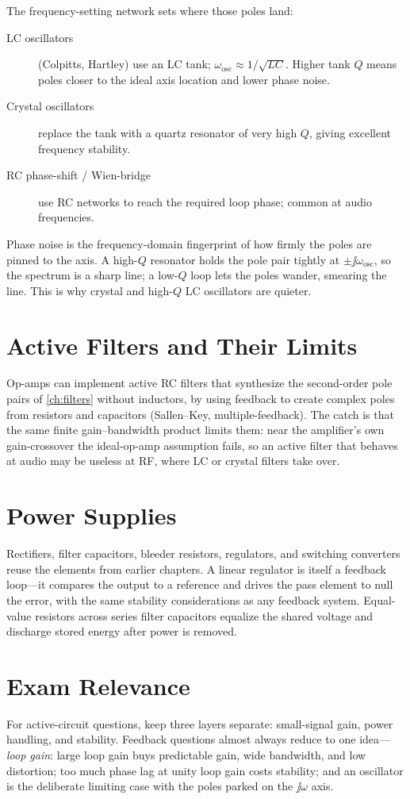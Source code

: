 The frequency-setting network sets where those poles land:
\begin{description}
\item[LC oscillators] (Colpitts, Hartley) use an LC tank; \(\omega_{\text{osc}}
\approx 1/\sqrt{LC}\). Higher tank \(Q\) means poles closer to the ideal axis
location and lower phase noise.
\item[Crystal oscillators] replace the tank with a quartz resonator of very high
\(Q\), giving excellent frequency stability.
\item[RC phase-shift / Wien-bridge] use RC networks to reach the required loop
phase; common at audio frequencies.
\end{description}

\begin{physicalbox}
Phase noise is the frequency-domain fingerprint of how firmly the poles are
pinned to the axis. A high-\(Q\) resonator holds the pole pair tightly at
\(\pm\jj\omega_{\text{osc}}\), so the spectrum is a sharp line; a low-\(Q\) loop
lets the poles wander, smearing the line. This is why crystal and high-\(Q\) LC
oscillators are quieter.
\end{physicalbox}

\section{Active Filters and Their Limits}
Op-amps can implement active RC filters that synthesize the second-order pole
pairs of \cref{ch:filters} without inductors, by using feedback to create complex
poles from resistors and capacitors (Sallen--Key, multiple-feedback). The catch
is that the same finite gain--bandwidth product limits them: near the amplifier's
own gain-crossover the ideal-op-amp assumption fails, so an active filter that
behaves at audio may be useless at RF, where LC or crystal filters take over.

\section{Power Supplies}
Rectifiers, filter capacitors, bleeder resistors, regulators, and switching
converters reuse the elements from earlier chapters. A linear regulator is itself
a feedback loop---it compares the output to a reference and drives the pass
element to null the error, with the same stability considerations as any feedback
system. Equal-value resistors across series filter capacitors equalize the shared
voltage and discharge stored energy after power is removed.

\section{Exam Relevance}
\begin{exambox}
For active-circuit questions, keep three layers separate: small-signal gain,
power handling, and stability. Feedback questions almost always reduce to one
idea---\emph{loop gain}: large loop gain buys predictable gain, wide bandwidth,
and low distortion; too much phase lag at unity loop gain costs stability; and an
oscillator is the deliberate limiting case with the poles parked on the
\(\jj\omega\) axis.
\end{exambox}
